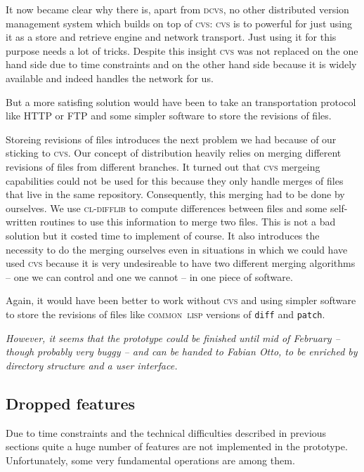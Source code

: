 \documentclass[fleqn, 10pt, a4paper]{report} \usepackage{amssymb}
\begin{document}
It now became clear why there is, apart from \textsc{dcvs}, no other
distributed version management system which builds on top of
\textsc{cvs}: \textsc{cvs} is to powerful for just using it as a store
and retrieve engine and network transport. Just using it for this
purpose needs a lot of tricks. Despite this insight \textsc{cvs} was
not replaced on the one hand side due to time constraints and on the
other hand side because it is widely available and indeed handles the
network for us.

But a more satisfing solution would have been to take an
transportation protocol like HTTP or FTP and some simpler software to
store the revisions of files.

Storeing revisions of files introduces the next problem we had because
of our sticking to \textsc{cvs}. Our concept of distribution heavily
relies on merging different revisions of files from different
branches. It turned out that \textsc{cvs} mergeing capabilities could
not be used for this because they only handle merges of files that
live in the same repository. Consequently, this merging had to be done
by ourselves. We use \textsc{cl-difflib} \cite{Cldi06} to compute differences
between files and some self-written routines to use this information
to merge two files. This is not a bad solution but it costed time to
implement of course. It also introduces the necessity to do the
merging ourselves even in situations in which we could have used
\textsc{cvs} because it is very undesireable to have two different
merging algorithms -- one we can control and one we cannot -- in one
piece of software.

Again, it would have been better to work without \textsc{cvs} and
using simpler software to store the revisions of files like
\textsc{common~lisp} versions of \texttt{diff} and \texttt{patch}.

\emph{
However, it seems that the prototype could be finished until mid of
February -- though probably very buggy -- and can be handed to Fabian
Otto, to be enriched by directory structure and a user interface.
}


\subsection{Dropped features}

Due to time constraints and the technical difficulties described in
previous sections quite a huge number of features are not
implemented in the prototype. Unfortunately, some very fundamental
operations are among them.
\end{document}
